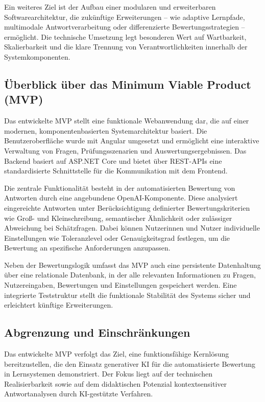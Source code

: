 \documentclass[a4paper,12pt]{article}
\begin{document}
Ein weiteres Ziel ist der Aufbau einer modularen und erweiterbaren Softwarearchitektur, die zukünftige Erweiterungen – wie adaptive Lernpfade, multimodale Antwortverarbeitung oder differenzierte Bewertungsstrategien – ermöglicht. Die technische Umsetzung legt besonderen Wert auf Wartbarkeit, Skalierbarkeit und die klare Trennung von Verantwortlichkeiten innerhalb der Systemkomponenten.

\subsection{Überblick über das Minimum Viable Product (MVP)}
Das entwickelte MVP stellt eine funktionale Webanwendung dar, die auf einer modernen, komponentenbasierten Systemarchitektur basiert. Die Benutzeroberfläche wurde mit Angular umgesetzt und ermöglicht eine interaktive Verwaltung von Fragen, Prüfungsszenarien und Auswertungsergebnissen. Das Backend basiert auf ASP.NET Core und bietet über REST-APIs eine standardisierte Schnittstelle für die Kommunikation mit dem Frontend.

Die zentrale Funktionalität besteht in der automatisierten Bewertung von Antworten durch eine angebundene OpenAI-Komponente. Diese analysiert eingereichte Antworten unter Berücksichtigung definierter Bewertungskriterien wie Groß- und Kleinschreibung, semantischer Ähnlichkeit oder zulässiger Abweichung bei Schätzfragen. Dabei können Nutzerinnen und Nutzer individuelle Einstellungen wie Toleranzlevel oder Genauigkeitsgrad festlegen, um die Bewertung an spezifische Anforderungen anzupassen.

Neben der Bewertungslogik umfasst das MVP auch eine persistente Datenhaltung über eine relationale Datenbank, in der alle relevanten Informationen zu Fragen, Nutzereingaben, Bewertungen und Einstellungen gespeichert werden. Eine integrierte Teststruktur stellt die funktionale Stabilität des Systems sicher und erleichtert künftige Erweiterungen.

\subsection{Abgrenzung und Einschränkungen}
Das entwickelte MVP verfolgt das Ziel, eine funktionsfähige Kernlösung bereitzustellen, die den Einsatz generativer KI für die automatisierte Bewertung in Lernsystemen demonstriert. Der Fokus liegt auf der technischen Realisierbarkeit sowie auf dem didaktischen Potenzial kontextsensitiver Antwortanalysen durch KI-gestützte Verfahren.
\end{document}
